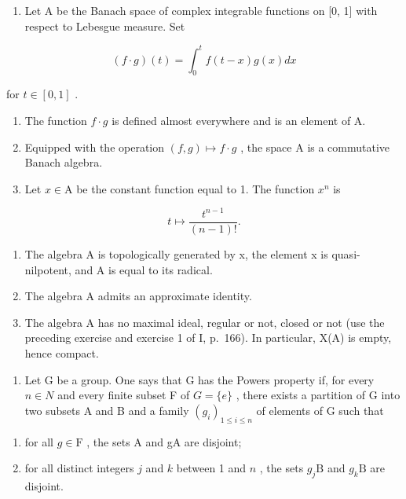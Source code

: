\begin{enumerate}
\def\labelenumi{\arabic{enumi})}
\setcounter{enumi}{30}
\tightlist
\item
  Let A be the Banach space of complex integrable functions on {[}0, 1{]} with respect to Lebesgue measure. Set
\end{enumerate}

\[
(f \cdot g) (t) = \int_ {0} ^ {t} f (t - x) g (x) d x
\]

for \(t \in [0, 1]\) .

\begin{enumerate}
\def\labelenumi{\alph{enumi})}
\item
  The function \(f \cdot g\) is defined almost everywhere and is an element of A.
\item
  Equipped with the operation \((f,g)\mapsto f\cdot g\) , the space A is a commutative Banach algebra.
\item
  Let \(x \in \mathrm{A}\) be the constant function equal to 1. The function \(x^n\) is
\end{enumerate}

\[
t \mapsto \frac {t ^ {n - 1}}{(n - 1) !}.
\]

\begin{enumerate}
\def\labelenumi{\alph{enumi})}
\setcounter{enumi}{3}
\item
  The algebra A is topologically generated by x, the element x is quasi-nilpotent, and A is equal to its radical.
\item
  The algebra A admits an approximate identity.
\item
  The algebra A has no maximal ideal, regular or not, closed or not (use the preceding exercise and exercise 1 of I, p.~166). In particular, X(A) is empty, hence compact.
\end{enumerate}

\begin{enumerate}
\def\labelenumi{\arabic{enumi})}
\setcounter{enumi}{31}
\tightlist
\item
  Let G be a group. One says that G has the Powers property if, for every \(n \in N\) and every finite subset F of \(G = \{e\}\) , there exists a partition of G into two subsets A and B and a family \((g_i)_{1 \leqslant i \leqslant n}\) of elements of G such that
\end{enumerate}

\begin{enumerate}
\def\labelenumi{(\roman{enumi})}
\item
  for all \(g \in \mathrm{F}\) , the sets A and gA are disjoint;
\item
  for all distinct integers \(j\) and \(k\) between 1 and \(n\) , the sets \(g_{j}\mathrm{B}\) and \(g_{k}\mathrm{B}\) are disjoint.
\end{enumerate}

